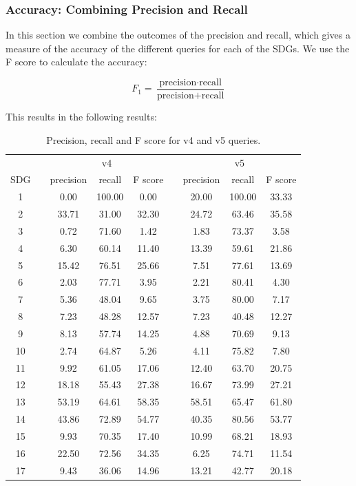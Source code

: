 \documentclass{article}
\begin{document}
\subsubsection{Accuracy: Combining Precision and Recall}
In this section we combine the outcomes of the precision and recall, which gives a measure of the accuracy of the different queries for each of the SDGs. We use the F score to calculate the accuracy:

\begin{equation*}
    F_1 = \frac{\text{precision}\cdot\text{recall}}{\text{precision}+\text{recall}}
\end{equation*}

This results in the following results:

\begin{table}[H]
\centering 
\begin{tabular}{c c ccc c ccc}
\toprule
&&\multicolumn{3}{c}{v4}&&\multicolumn{3}{c}{v5}\\
\cline{3-5} \cline{7-9}
SDG && precision & recall & F score && precision & recall & F score \\
 \hline
 1 && 0.00 & 100.00 & 0.00 && 20.00 & 100.00 & 33.33 \\
 2 && 33.71 & 31.00 & 32.30 && 24.72 & 63.46 & 35.58 \\
 3 && 0.72 & 71.60 & 1.42 && 1.83 & 73.37 & 3.58 \\
 4 && 6.30 & 60.14 & 11.40 && 13.39 & 59.61 & 21.86 \\
 5 && 15.42 & 76.51 & 25.66 && 7.51 & 77.61 & 13.69 \\
 6 && 2.03 & 77.71 & 3.95 && 2.21 & 80.41 & 4.30 \\
 7 && 5.36 & 48.04 & 9.65 && 3.75 & 80.00 & 7.17 \\
 8 && 7.23 & 48.28 & 12.57 && 7.23 & 40.48 & 12.27 \\
 9 && 8.13 & 57.74 & 14.25 && 4.88 & 70.69 & 9.13 \\
 10 && 2.74 & 64.87 & 5.26 && 4.11 & 75.82 & 7.80 \\
 11 && 9.92 & 61.05 & 17.06 && 12.40 & 63.70 & 20.75 \\
 12 && 18.18 & 55.43 & 27.38 && 16.67 & 73.99 & 27.21 \\
 13 && 53.19 & 64.61 & 58.35 && 58.51 & 65.47 & 61.80 \\
 14 && 43.86 & 72.89 & 54.77 && 40.35 & 80.56 & 53.77 \\
 15 && 9.93 & 70.35 & 17.40 && 10.99 & 68.21 & 18.93 \\
 16 && 22.50 & 72.56 & 34.35 && 6.25 & 74.71 & 11.54 \\
 17 && 9.43 & 36.06 & 14.96 && 13.21 & 42.77 & 20.18 \\
 \bottomrule
\end{tabular}
\caption{Precision, recall and F score for v4 and v5 queries.}
\label{precisiondatatab}
\end{table}
\end{document}
